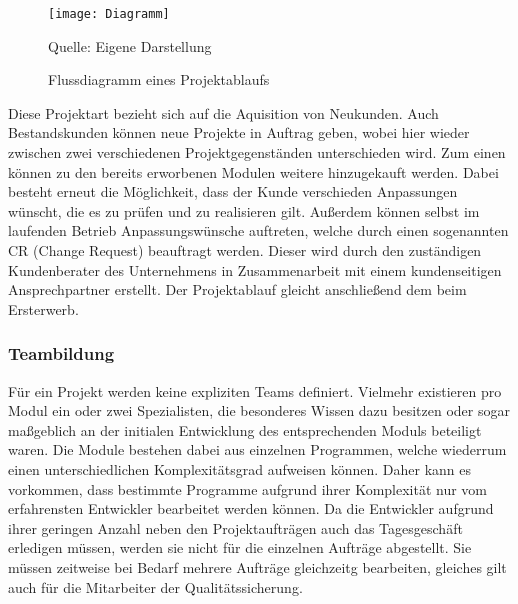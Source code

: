 \begin{figure}[H]
\begin{center}
\texttt{[image: Diagramm]}
\caption{Flussdiagramm eines Projektablaufs}
Quelle: Eigene Darstellung
\end{center}
\end{figure}
\vspace{-1cm}

Diese Projektart bezieht sich auf die Aquisition von Neukunden. Auch Bestandskunden können neue Projekte in Auftrag geben, wobei hier wieder zwischen zwei verschiedenen Projektgegenständen unterschieden wird. Zum einen können zu den bereits erworbenen Modulen weitere hinzugekauft werden. Dabei besteht erneut die Möglichkeit, dass der Kunde verschieden Anpassungen wünscht, die es zu prüfen und zu realisieren gilt. Außerdem können selbst im laufenden Betrieb Anpassungswünsche auftreten, welche durch einen sogenannten CR (Change Request) beauftragt werden. Dieser wird durch den zuständigen Kundenberater des Unternehmens in Zusammenarbeit mit einem kundenseitigen Ansprechpartner erstellt. Der Projektablauf gleicht anschließend dem beim Ersterwerb.

\subsubsection{Teambildung}
Für ein Projekt werden keine expliziten Teams definiert. Vielmehr existieren pro Modul ein oder zwei Spezialisten, die besonderes Wissen dazu besitzen oder sogar maßgeblich an der initialen Entwicklung des entsprechenden Moduls beteiligt waren. Die Module bestehen dabei aus einzelnen Programmen, welche wiederrum einen unterschiedlichen Komplexitätsgrad aufweisen können. Daher kann es vorkommen, dass bestimmte Programme aufgrund ihrer Komplexität nur vom erfahrensten Entwickler bearbeitet werden können. Da die Entwickler aufgrund ihrer geringen Anzahl neben den Projektaufträgen auch das Tagesgeschäft erledigen müssen, werden sie nicht für die einzelnen Aufträge abgestellt. Sie müssen zeitweise bei Bedarf mehrere Aufträge gleichzeitg bearbeiten, gleiches gilt auch für die Mitarbeiter der Qualitätssicherung.

